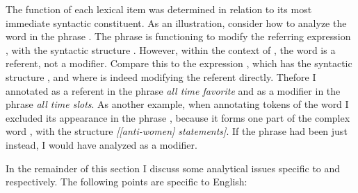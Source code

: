 The function of each lexical item was determined in relation to its most immediate syntactic constituent. As an illustration, consider how to analyze the word  in the phrase . The phrase  is functioning to modify the referring expression , with the syntactic structure . However, within the context of , the word  is a referent, not a modifier. Compare this to the expression , which has the syntactic structure , and where  is indeed modifying the referent  directly. Thefore I annotated  as a referent in the phrase \textit{all time favorite} and as a modifier in the phrase \textit{all time slots}. As another example, when annotating tokens of the word  I excluded its appearance in the phrase , because it forms one part of the complex word , with the structure \textit{[[anti-women] statements]}. If the phrase had been just  instead, I would have analyzed  as a modifier.

In the remainder of this section I discuss some analytical issues specific to  and  respectively. The following points are specific to English:

